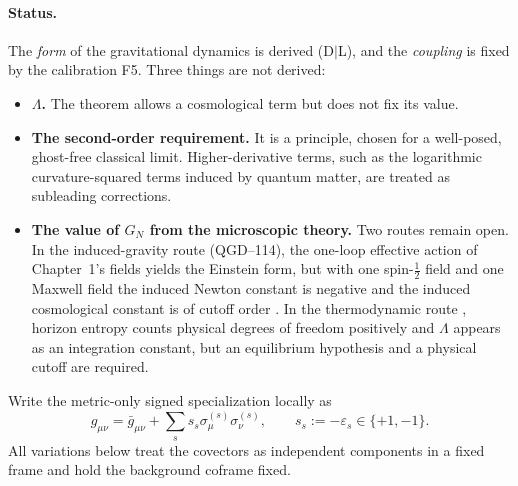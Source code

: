 \documentclass[11pt,a4paper]{article}
\begin{document}
\paragraph{Status.} The \emph{form} of the gravitational dynamics is derived
(D$\mid$L), and the \emph{coupling} is fixed by the calibration F5. Three things are
not derived:
\begin{itemize}
\item \textbf{$\Lambda$.} The theorem allows a cosmological term but does not fix its
value.
\item \textbf{The second-order requirement.} It is a principle, chosen for a
well-posed, ghost-free classical limit. Higher-derivative terms, such as the
logarithmic curvature-squared terms induced by quantum matter, are treated as
subleading corrections.
\item \textbf{The value of $G_N$ from the microscopic theory.} Two routes remain
open. In the induced-gravity route (QGD--114), the one-loop effective action of
Chapter~1's fields yields the Einstein form, but with one spin-$\frac12$ field and
one Maxwell field the induced Newton constant is negative and the induced
cosmological constant is of cutoff order \cite{Sakharov,Visser}. In the
thermodynamic route \cite{Jacobson}, horizon entropy counts physical degrees of
freedom positively and $\Lambda$ appears as an integration constant, but an
equilibrium hypothesis and a physical cutoff are required.
\end{itemize}

Write the metric-only signed specialization locally as
\begin{equation}\label{eq:signed}
g_{\mu\nu}=\bar g_{\mu\nu}
+\sum_s s_s\sigma^{(s)}_\mu\sigma^{(s)}_\nu,
\qquad s_s:=-\varepsilon_s\in\{+1,-1\}.
\end{equation}
All variations below treat the covectors as independent components
in a fixed frame and hold the background coframe fixed.
\end{document}
